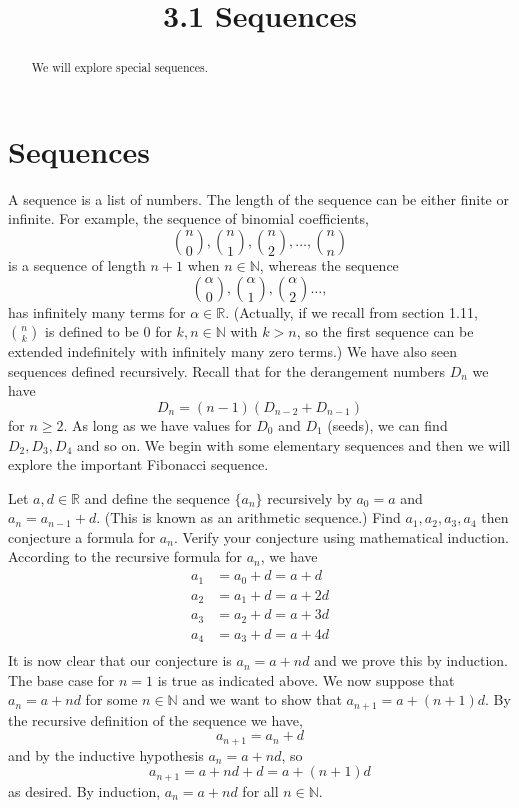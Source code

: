 \documentclass[handout]{ximera}
\title{3.1 Sequences}
\begin{document}
\begin{abstract}
We will explore special sequences.
\end{abstract}

\maketitle

\section{Sequences}
A sequence is a list of numbers. The length of the sequence can be either finite or infinite. For example,
the sequence of binomial coefficients,
\[
\binom{n}{0}, \binom{n}{1}, \binom{n}{2}, \dots, \binom{n}{n}
\]
is a sequence of length $n+1$ when $n\in \mathbb{N}$, whereas the sequence
\[
\binom{\alpha}{0}, \binom{\alpha}{1}, \binom{\alpha}{2} \dots, 
\]
has infinitely many terms for $\alpha \in \mathbb{R}$.
(Actually, if we recall from section 1.11, $\binom{n}{k}$ is defined to be $0$ for $k,n \in \mathbb{N}$ with $k > n$, 
so the first sequence can be extended indefinitely with infinitely many zero terms.)
We have also seen sequences defined recursively. Recall that for the derangement numbers $D_n$ we have
\[
D_n = (n-1)(D_{n-2} + D_{n-1})
\]
for $n \geq 2$. As long as we have values for $D_0$ and $D_1$ (seeds), we can find $D_2, D_3, D_4$ and so on.
We begin with some elementary sequences and then we will explore the important Fibonacci sequence.

\begin{example}[Example 1]
Let $a, d \in \mathbb{R}$ and define the sequence $\{a_n\}$ recursively by $a_0 = a$ and $a_n = a_{n-1} + d$.  (This is known as an arithmetic sequence.)
Find $a_1, a_2, a_3, a_4$ then conjecture a formula for $a_n$. Verify your conjecture using mathematical induction.\\
According to the recursive formula for $a_n$, we have
\begin{align*}
a_1 &= a_0 + d= a+d\\
a_2 &= a_1 + d= a+2d\\
a_3 &= a_2 + d= a+3d\\
a_4 &= a_3 + d= a+4d\\
\end{align*}
It is now clear that our conjecture is $a_n = a + nd$ and we prove this by induction. The base case for $n=1$ is true as indicated above.
We now suppose that $a_n = a + nd$ for some $n \in \mathbb{N}$ and we want to show that $a_{n+1} = a + (n+1)d$. 
By the recursive definition of the sequence we have,
\[
a_{n+1} = a_n + d
\]
and by the inductive hypothesis $a_n = a + nd$, so
\[
a_{n+1} = a + nd + d = a + (n+1)d
\]
as desired. By induction, $a_n = a + nd$ for all $n \in \mathbb{N}$.
\end{example}
\end{document}
